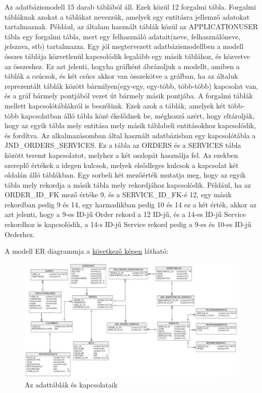 \documentclass[centeredchapter]{thesis-ekf}
\theoremstyle{definition}
\theoremstyle{remark}
\begin{document}
Az adatbázismodell 15 darab táblából áll. Ezek közül 12 forgalmi tábla. Forgalmi tábláknak azokat a táblákat nevezzük, amelyek egy entitásra jellemző adatokat tartalmaznak. Például, az általam használt táblák közül az APPLICATIONUSER tábla egy forgalmi tábla, mert egy felhasználó adatait(neve, felhasználóneve, jelszava, stb) tartalmazza. Egy jól megtervezett adatbázismodellben a modell összes táblája közvetlenül kapcsolódik legalább egy másik táblához, és közvetve az összeshez. Ez azt jelenti, hogyha gráfként ábrázoljuk a modellt, amiben a táblák a csúcsok, és két csúcs akkor van összekötve a gráfban, ha az általuk reprezentált táblák között bármilyen(egy-egy, egy-több, több-több) kapcsolat van, és a gráf bármely pontjából vezet út bármely másik pontjába. A forgalmi táblák mellett kapcsolótáblákról is beszélünk. Ezek azok a táblák, amelyek két több-több kapcsolatban álló tábla közé ékelődnek be, méghozzá azért, hogy eltárolják, hogy az egyik tábla mely entitása mely másik táblabeli entitásokhoz kapcsolódik, és fordítva. Az alkalmazásomban által használt adatbázisban egy kapcsolótábla a JND\_ORDERS\_SERVICES. Ez a tábla az ORDERS és a SERVICES tábla között teremt kapcsolatot, melyhez a két oszlopát használja fel. Az ezekben szereplő értékek a idegen kulcsok, melyek elsődleges kulcsok a kapcsolat két oldalán álló táblákban. Egy sorbeli két mezőérték mutatja meg, hogy az egyik tábla mely rekordja a másik tábla mely rekordjához kapcsolódik. Például, ha az ORDER\_ID\_FK mező értéke 9, és a SERVICE\_ID\_FK-é 12, egy másik rekordban pedig 9 és 14, egy harmadikban pedig 10 és 14 ez a két érték, akkor az azt jelenti, hogy a 9-es ID-jű Order rekord a 12 ID-jű, és a 14-es ID-jű Service rekordhoz is kapcsolódik, a 14-s ID-jű Service rekord pedig a 9-es és 10-es ID-jű Orderhez.


A modell ER diagrammja a \hyperlink{figure-db}{következő képen} látható:
\newpage

\begin{figure}[!h]\hypertarget{figure-db}{}
	\centering
	\includegraphics[width=23.1cm, angle=270]{adatbazis-modell.png}
	\caption{Az adattáblák és kapcsolataik}
\end{figure}
\end{document}
